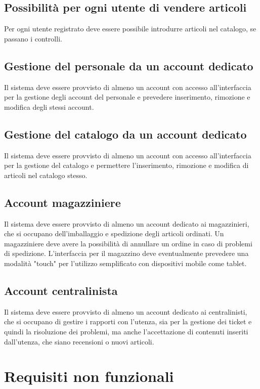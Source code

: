 \documentclass[12pt,a4paper]{article}
\begin{document}
\subsection{Possibilità per ogni utente di vendere articoli}
Per ogni utente registrato deve essere possibile introdurre articoli nel catalogo, se passano i controlli.

\subsection{Gestione del personale da un account dedicato}
Il sistema deve essere provvisto di almeno un account con accesso all'interfaccia per la gestione degli account del personale e prevedere inserimento, rimozione e modifica degli stessi account.

\subsection{Gestione del catalogo da un account dedicato}
Il sistema deve essere provvisto di almeno un account con accesso all'interfaccia per la gestione del catalogo e permettere l'inserimento, rimozione e modifica di articoli nel catalogo stesso.

\subsection{Account magazziniere}
Il sistema deve essere provvisto di almeno un account dedicato ai magazzinieri, che si occupano dell'imballaggio e spedizione degli articoli ordinati. Un magazziniere deve avere la possibilità di annullare un ordine in caso di problemi di spedizione. L'interfaccia per il magazzino deve eventualmente prevedere una modalità "touch" per l'utilizzo semplificato con dispositivi mobile come tablet.

\subsection{Account centralinista}
Il sistema deve essere provvisto di almeno un account dedicato ai centralinisti, che si occupano di gestire i rapporti con l'utenza, sia per la gestione dei ticket e quindi la risoluzione dei problemi, ma anche l'accettazione di contenuti inseriti dall'utenza, che siano recensioni o nuovi articoli.

\section{Requisiti non funzionali}
\end{document}
